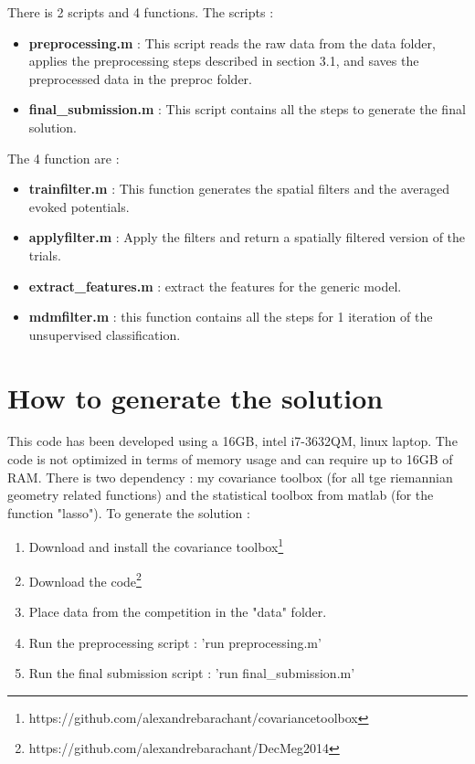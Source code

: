 \documentclass[11pt,a4paper]{article}
\begin{document}
There is 2 scripts and 4 functions. The scripts :
\begin{itemize}
\item \textbf{preprocessing.m} : This script reads the raw data from the data folder, applies the preprocessing steps described in section 3.1, and saves the preprocessed data in the preproc folder.
\item \textbf{final\_submission.m} : This script contains all the steps to generate the final solution.
\end{itemize}
The 4 function are : 
\begin{itemize}
\item \textbf{trainfilter.m} : This function generates the spatial filters and the averaged evoked potentials.
\item \textbf{applyfilter.m} : Apply the filters and return a spatially filtered version of the trials.
\item \textbf{extract\_features.m} : extract the features for the generic model.
\item \textbf{mdmfilter.m} : this function contains all the steps for 1 iteration of the unsupervised classification.
\end{itemize}
\section{How to generate the solution}
This code has been developed using a 16GB, intel i7-3632QM, linux laptop. The code is not optimized in terms of memory usage and can require up to 16GB of RAM. There is two dependency : my covariance toolbox (for all tge riemannian geometry related functions) and the statistical toolbox from matlab (for the function "lasso").
To generate the solution : 
\begin{enumerate}
\item Download and install the covariance toolbox\footnote{https://github.com/alexandrebarachant/covariancetoolbox}
\item Download the code\footnote{https://github.com/alexandrebarachant/DecMeg2014}
\item Place data from the competition in the "data" folder.
\item Run the preprocessing script : 'run preprocessing.m'
\item Run the final submission script : 'run final\_submission.m' 
\end{enumerate}
\end{document}
